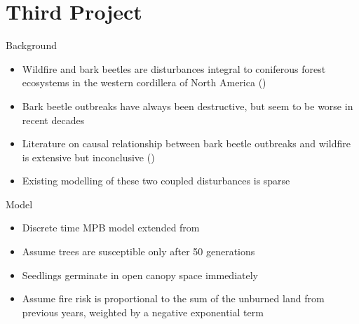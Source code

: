\documentclass{beamer}
\begin{document}
\section{Third Project}
\begin{frame}{Background}
    \begin{itemize}
        \item Wildfire and bark beetles are disturbances integral to coniferous forest ecosystems in the western cordillera of North America (\cite{kaufmann2008status})
        \item Bark beetle outbreaks have always been destructive, but seem to be worse in recent decades
        \item Literature on causal relationship between bark beetle outbreaks and wildfire is extensive but inconclusive (\citet{axelson2009influence})
        \item Existing modelling of these two coupled disturbances is sparse
    \end{itemize}
\end{frame}

\begin{frame}{Model}
    \begin{itemize}
        \item Discrete time MPB model extended from \citet{duncan2015model}
        \item Assume trees are susceptible only after 50 generations
        \item Seedlings germinate in open canopy space immediately 
        \item Assume fire risk is proportional to the sum of the unburned land from previous years, weighted by a negative exponential term
    \end{itemize}
\end{frame}
\end{document}
